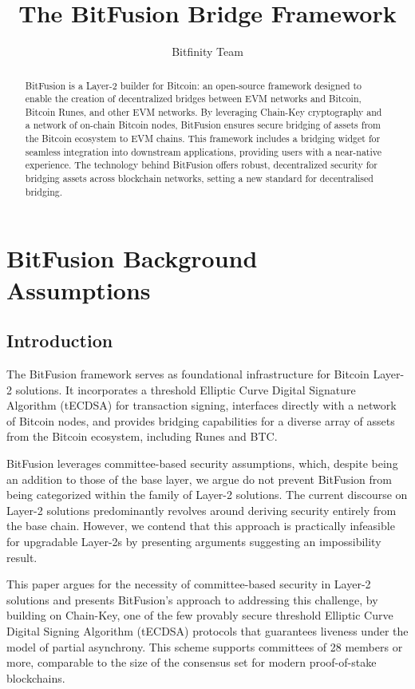 \documentclass{article}
\title{The BitFusion Bridge Framework}
\author{Bitfinity Team}
\begin{document}
\maketitle

\begin{abstract}
\noindent BitFusion is a Layer-2 builder for Bitcoin:  an open-source framework designed to enable the creation of decentralized bridges between EVM networks and Bitcoin, Bitcoin Runes, and other EVM networks. By leveraging Chain-Key cryptography and a network of on-chain Bitcoin nodes, BitFusion ensures secure bridging of assets from the Bitcoin ecosystem to EVM chains. This framework includes a bridging widget for seamless integration into downstream applications, providing users with a near-native experience. The technology behind BitFusion offers robust, decentralized security for bridging assets across blockchain networks, setting a new standard for decentralised bridging.


\end{abstract}

\tableofcontents

\section{BitFusion Background Assumptions} 
\subsection{Introduction} 

The BitFusion framework serves as foundational infrastructure for Bitcoin Layer-2 solutions. It incorporates a threshold Elliptic Curve Digital Signature Algorithm (tECDSA) for transaction signing, interfaces directly with a network of Bitcoin nodes, and provides bridging capabilities for a diverse array of assets from the Bitcoin ecosystem, including Runes and BTC.

BitFusion leverages committee-based security assumptions, which, despite being an addition to those of the base layer, we argue do not prevent BitFusion from being categorized within the family of Layer-2 solutions. The current discourse on Layer-2 solutions predominantly revolves around deriving security entirely from the base chain. However, we contend that this approach is practically infeasible for upgradable Layer-2s by presenting arguments suggesting an impossibility result. 

This paper argues for the necessity of committee-based security in Layer-2 solutions and presents BitFusion’s approach to addressing this challenge, by building on Chain-Key, one of the few provably secure threshold Elliptic Curve Digital Signing Algorithm (tECDSA) protocols that guarantees liveness under the model of partial asynchrony. This scheme supports committees of 28 members or more, comparable to the size of the consensus set for modern proof-of-stake blockchains. 
\end{document}
